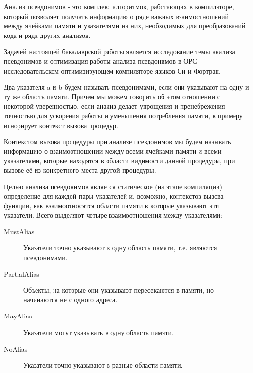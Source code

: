 





\Intro

Анализ псевдонимов - это комплекс алгоритмов, работающих в компиляторе, который позволяет получать информацию о ряде важных взаимоотношений между ячейками памяти и указателями на них, необходимых для преобразований кода и ряда других анализов.
%
%
%
%

Задачей настоящей бакалаврской работы является исследование темы анализа псевдонимов и оптимизация работы анализа псевдонимов в ОРС - исследовательском оптимизирующем компиляторе языков Си и Фортран.



Два указателя a и b будем называть псевдонимами, если они указывают на одну и ту же область памяти. Причем мы можем говорить об этом отношении с некоторой уверенностью, если анализ делает упрощения и пренебрежения точностью для ускорения работы и уменьшения потребления памяти, к примеру игнорирует контекст вызова процедур.

Контекстом вызова процедуры при анализе псевдонимов мы будем называть информацию о взаимоотношении между всеми ячейками памяти и всеми указателями, которые находятся в области видимости данной процедуры, при вызове её из конкретного места другой процедуры. 

Целью анализа псевдонимов является статическое (на этапе компиляции) определение для каждой пары указателей и, возможно, контекстов вызова функции, как взаимоотносятся области памяти в которые указывают эти указатели. Всего выделяют четыре взаимоотношения между указателями:
%
%
%
%
\begin{description}
  \item[MustAlias] Указатели точно указывают в одну область памяти, т.е. являются псевдонимами.
  \item[PartialAlias] Объекты, на которые они указывают пересекаются в памяти, но начинаются не с одного адреса.
  \item[MayAlias] Указатели могут указывать в одну область памяти.
  \item[NoAlias] Указатели точно указывают в разные области памяти.
\end{description}

